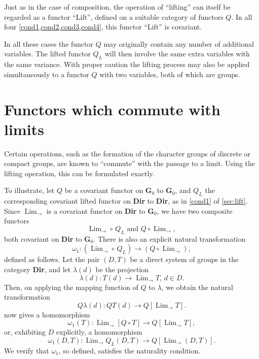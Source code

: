 \documentclass[11pt,a4paper]{report}
\DeclareMathOperator{\Lim}{Lim}
\begin{document}
Just as in the case of composition, the operation of ``lifting'' can itself be regarded as a functor ``Lift'', defined on a 
suitable category of functors $Q$. In all four \cref{cond1,cond2,cond3,cond4}, this functor ``Lift'' is covariant.

In all these cases the functor $Q$ may originally contain any number of additional variables. The lifted functor $Q_L$ will
then involve the same extra variables with the same variance. With proper caution the lifting process may also be applied 
simultaneously to a functor $Q$ with two variables, both of which are groups.

\section{Functors which commute with limits}\label{sec:func_comm_lim}
Certain operations, such as the formation of the character groups of discrete or compact groups, are known to ``commute''
with the passage to a limit. Using the lifting operation, this can be formulated exactly.

To illustrate, let $Q$ be a covariant functor on $\mathbf{G}_0$ to $\mathbf{G}_0$, and $Q_L$ the corresponding
covariant lifted functor on \textbf{Dir} to \textbf{Dir}, as in \cref{cond1} of \cref{sec:lift}. Since $\Lim_{\rightarrow}$
is a covariant functor on \textbf{Dir} to $\mathbf{G}_0$, we have two composite functors
\begin{equation*}
	\Lim_{\rightarrow}\circ\,Q_L\text{ and } Q\circ \Lim_{\rightarrow},
\end{equation*}
both covariant on \textbf{Dir} to $\mathbf{G}_0$. There is also an explicit natural transformation
\begin{equation}\label{eq:lim_nat}
	\omega_1:(\Lim_{\rightarrow}\circ\,Q_L)\rightarrow (Q\circ \Lim_{\rightarrow}),
\end{equation}
defined as follows. Let the pair $(D,T)$ be a direct system of groups in the category \textbf{Dir}, and let $\lambda(d)$ be
the projection
\begin{equation*}
	\lambda(d):T(d)\rightarrow \Lim_{\rightarrow}T,\,d\in D.
\end{equation*}
Then, on applying the mapping function of $Q$ to $\lambda$, we obtain the natural transformation
\begin{equation*}
	Q\lambda(d): Q T(d)\rightarrow Q[\Lim_{\rightarrow}T].
\end{equation*}
 now gives a homomorphism
\begin{equation*}
	\omega_1(T):\Lim_{\rightarrow}[Q\circ T]\rightarrow Q[\Lim_{\rightarrow} T],
\end{equation*}
or, exhibiting $D$ explicitly, a homomorphism
\begin{equation*}
	\omega_1(D,T):\Lim_{\rightarrow}Q_L(D,T)\rightarrow Q[\Lim_{\rightarrow} (D,T)].
\end{equation*}
We verify that $\omega_1$, so defined, satisfies the naturality condition.
\end{document}
